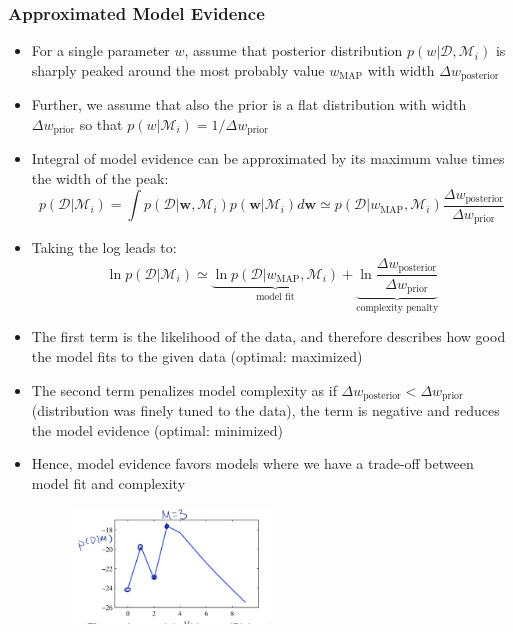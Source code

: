 \subsubsection{Approximated Model Evidence}
\begin{itemize}
	\item For a single parameter $w$, assume that posterior distribution $p\left(w|\mathcal{D}, \mathcal{M}_i\right)$ is sharply peaked around the most probably value $w_{\text{MAP}}$ with width $\Delta w_{\text{posterior}}$
	\item Further, we assume that also the prior is a flat distribution with width $\Delta w_{\text{prior}}$ so that $p\left(w|\mathcal{M}_i\right) = 1/\Delta w_{\text{prior}}$
	\item Integral of model evidence can be approximated by its maximum value times the width of the peak:
	 $$p\left(\mathcal{D}|\mathcal{M}_i\right) = \int p\left(\mathcal{D}|\bm{w}, \mathcal{M}_i\right)p\left(\bm{w}|\mathcal{M}_i\right)d\bm{w}\simeq p\left(\mathcal{D}|w_{\text{MAP}}, \mathcal{M}_i\right)\frac{\Delta w_{\text{posterior}}}{\Delta w_{\text{prior}}}$$
	 \item Taking the log leads to:
	 $$\ln p\left(\mathcal{D}|\mathcal{M}_i\right) \simeq \underbrace{\ln p\left(\mathcal{D}|w_{\text{MAP}}, \mathcal{M}_i\right)}_{\text{model fit}} + \underbrace{\ln \frac{\Delta w_{\text{posterior}}}{\Delta w_{\text{prior}}}}_{\text{complexity penalty}}$$
	 \item The first term is the likelihood of the data, and therefore describes how good the model fits to the given data (optimal: maximized)
	 \item The second term penalizes model complexity as if $\Delta w_{\text{posterior}} < \Delta w_{\text{prior}}$ (distribution was finely tuned to the data), the term is negative and reduces the model evidence (optimal: minimized)
	 \item Hence, model evidence favors models where we have a trade-off between model fit and complexity
	 \begin{figure}[ht]
	 	\centering
	 	\includegraphics[width=0.5\textwidth]{figures/bayesian_model_comparison_log.png}

\end{figure}
\end{itemize}
